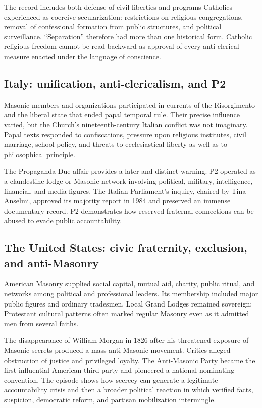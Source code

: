 The record includes both defense of civil liberties and programs Catholics experienced as coercive secularization: restrictions on religious congregations, removal of confessional formation from public structures, and political surveillance. “Separation” therefore had more than one historical form. Catholic religious freedom cannot be read backward as approval of every anti-clerical measure enacted under the language of conscience.

\subsection{Italy: unification, anti-clericalism, and P2}

Masonic members and organizations participated in currents of the Risorgimento and the liberal state that ended papal temporal rule. Their precise influence varied, but the Church's nineteenth-century Italian conflict was not imaginary. Papal texts responded to confiscations, pressure upon religious institutes, civil marriage, school policy, and threats to ecclesiastical liberty as well as to philosophical principle.

The Propaganda Due affair provides a later and distinct warning. P2 operated as a clandestine lodge or Masonic network involving political, military, intelligence, financial, and media figures. The Italian Parliament's inquiry, chaired by Tina Anselmi, approved its majority report in 1984 and preserved an immense documentary record. P2 demonstrates how reserved fraternal connections can be abused to evade public accountability.

\subsection{The United States: civic fraternity, exclusion, and anti-Masonry}

American Masonry supplied social capital, mutual aid, charity, public ritual, and networks among political and professional leaders. Its membership included major public figures and ordinary tradesmen. Local Grand Lodges remained sovereign; Protestant cultural patterns often marked regular Masonry even as it admitted men from several faiths.

The disappearance of William Morgan in 1826 after his threatened exposure of Masonic secrets produced a mass anti-Masonic movement. Critics alleged obstruction of justice and privileged loyalty. The Anti-Masonic Party became the first influential American third party and pioneered a national nominating convention. The episode shows how secrecy can generate a legitimate accountability crisis and then a broader political reaction in which verified facts, suspicion, democratic reform, and partisan mobilization intermingle.

